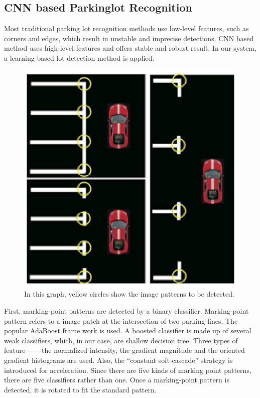 \documentclass[journal]{IEEEtran}
\begin{document}
\subsection{CNN based Parkinglot Recognition}

Most traditional parking lot recognition methods use low-level features, such as corners and edges, which result in unstable and imprecise detections.
CNN based method uses high-level features and offers stable and robust result. 
In our system, a learning based lot detection method \cite{Li2017Vision} is applied.

\begin{figure}
\centering
\includegraphics{pic/fig3_CNN_based_Parkinglot_Recognition}
\caption{
In this graph, yellow circles show the image patterns to be detected.\cite{Li2017Vision}
}\label{fig:3}
\end{figure}

First, marking-point patterns are detected by a binary classifier. 
Marking-point pattern refers to a image patch at the intersection of two parking-lines.
\cite{Li2017Vision} The popular AdaBoost frame work is used. 
A boosted classifier is made up of several weak classifiers, which, in our case, are shallow decision tree. 
Three types of feature—— the normalized intensity, the gradient magnitude and the oriented gradient histograms are used. 
Also, the “constant soft-cascade” strategy\cite{Li2017Vision} is introduced for acceleration. 
Since there are five kinds of marking point patterns, there are five classifiers rather than one. 
Once a marking-point pattern is detected, it is rotated to fit the standard pattern. 
\end{document}
